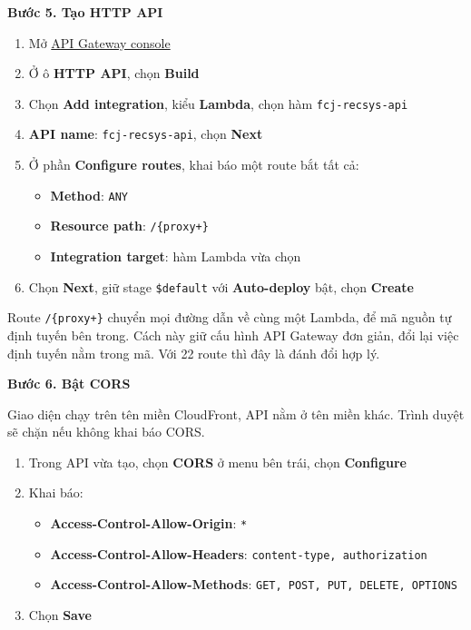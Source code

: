 \vspace{0.5em}\noindent\textbf{Bước 5. Tạo HTTP
API}\par

\begin{enumerate}
\def\labelenumi{\arabic{enumi}.}
\tightlist
\item
  Mở
  \href{https://ap-southeast-1.console.aws.amazon.com/apigateway/main/apis?region=ap-southeast-1}{API
  Gateway console}
\item
  Ở ô \textbf{HTTP API}, chọn \textbf{Build}
\item
  Chọn \textbf{Add integration}, kiểu \textbf{Lambda}, chọn hàm
  \texttt{fcj-recsys-api}
\item
  \textbf{API name}: \texttt{fcj-recsys-api}, chọn \textbf{Next}
\item
  Ở phần \textbf{Configure routes}, khai báo một route bắt tất cả:

  \begin{itemize}
  \tightlist
  \item
    \textbf{Method}: \texttt{ANY}
  \item
    \textbf{Resource path}: \texttt{/\{proxy+\}}
  \item
    \textbf{Integration target}: hàm Lambda vừa chọn
  \end{itemize}
\item
  Chọn \textbf{Next}, giữ stage \texttt{\$default} với
  \textbf{Auto-deploy} bật, chọn \textbf{Create}
\end{enumerate}

Route \texttt{/\{proxy+\}} chuyển mọi đường dẫn về cùng một Lambda, để
mã nguồn tự định tuyến bên trong. Cách này giữ cấu hình API Gateway đơn
giản, đổi lại việc định tuyến nằm trong mã. Với 22 route thì đây là đánh
đổi hợp lý.

\vspace{0.5em}\noindent\textbf{Bước 6. Bật CORS}\par

Giao diện chạy trên tên miền CloudFront, API nằm ở tên miền khác. Trình
duyệt sẽ chặn nếu không khai báo CORS.

\begin{enumerate}
\def\labelenumi{\arabic{enumi}.}
\tightlist
\item
  Trong API vừa tạo, chọn \textbf{CORS} ở menu bên trái, chọn
  \textbf{Configure}
\item
  Khai báo:

  \begin{itemize}
  \tightlist
  \item
    \textbf{Access-Control-Allow-Origin}: \texttt{*}
  \item
    \textbf{Access-Control-Allow-Headers}:
    \texttt{content-type,\ authorization}
  \item
    \textbf{Access-Control-Allow-Methods}:
    \texttt{GET,\ POST,\ PUT,\ DELETE,\ OPTIONS}
  \end{itemize}
\item
  Chọn \textbf{Save}
\end{enumerate}

